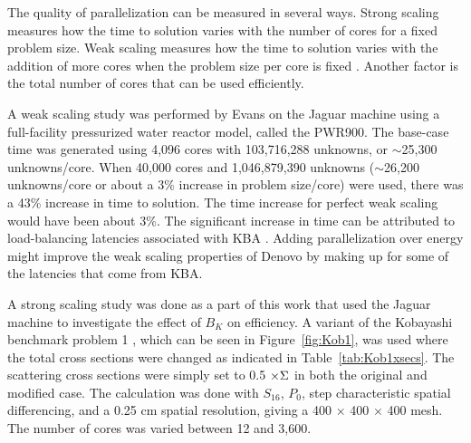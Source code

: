 The quality of parallelization can be measured in several ways. Strong scaling measures how the time to solution varies with the number of cores for a fixed problem size. Weak scaling measures how the time to solution varies with the addition of more cores when the problem size per core is fixed \cite{Bush2010}. Another factor is the total number of cores that can be used efficiently. 

A weak scaling study was performed by Evans on the Jaguar machine using a full-facility pressurized water reactor model, called the PWR900. The base-case time was generated using 4,096 cores with 103,716,288 unknowns, or $\sim$25,300 unknowns/core. When 40,000 cores and 1,046,879,390 unknowns ($\sim$26,200 unknowns/core or about a 3\% increase in problem size/core) were used, there was a 43\% increase in time to solution. The time increase for perfect weak scaling would have been about 3\%. The significant increase in time can be attributed to load-balancing latencies associated with KBA \cite{Evans2009d}. Adding parallelization over energy might improve the weak scaling properties of Denovo by making up for some of the latencies that come from KBA.

A strong scaling study was done as a part of this work that used the Jaguar machine to investigate the effect of $B_{K}$ on efficiency. A variant of the Kobayashi benchmark problem 1 \cite{Kobayashi2000}, which can be seen in Figure~\ref{fig:Kob1}, was used where the total cross sections were changed as indicated in Table~\ref{tab:Kob1xsecs}. The scattering cross sections were simply set to 0.5 $\times \Sigma$ in both the original and modified case. The calculation was done with $S_{16}$, $P_{0}$, step characteristic spatial differencing, and a 0.25 cm spatial resolution, giving a 400 $\times$ 400 $\times$ 400 mesh. The number of cores was varied between 12 and 3,600. 

